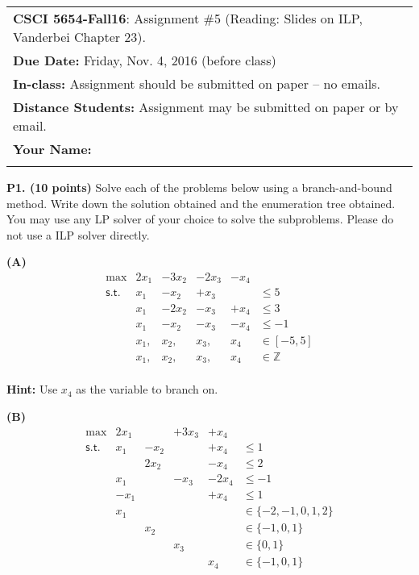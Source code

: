 \documentclass[11pt]{article}
\begin{document}
\begin{tabular}{l}
	\textbf{CSCI 5654-Fall16}: Assignment \#5 (Reading: Slides on ILP, Vanderbei Chapter 23).                                                  \\
	\textbf{Due Date:} Friday, Nov. 4, 2016 (before class)            \\
	\textbf{In-class:} Assignment should be submitted on paper -- no emails. \\
	\textbf{Distance Students:} Assignment may be submitted on paper or
	by email.                                                                \\[10pt]

	\textbf{Your Name:} \phantom{Supercalifragilisticexpialidocius Smith}    \\
	\hline
	                                                                         \\[10pt]
\end{tabular}

\noindent\textbf{P1. (10 points)} Solve each of the problems below using a branch-and-bound method. Write down the solution obtained and the enumeration tree
obtained. You may use any LP solver of your choice to solve the
subproblems. Please do not use a ILP solver directly.

\noindent\textbf{(A)} 
\[\begin{array}{rlllll}
\max & 2 x_1 & - 3 x_2 & -2 x_3 & - x_4 \\
\mathsf{s.t.} & x_1 & - x_2 & + x_3 &   & \leq 5 \\
& x_1 & - 2 x_2 & - x_3 & +x_4   & \leq 3 \\
& x_1 & - x_2 & - x_3 & - x_4 & \leq -1 \\
& x_1, & x_2, & x_3, & x_4 & \in [-5, 5] \\
& x_1, & x_2, & x_3, & x_4 & \in \mathbb{Z} \\
\end{array} \]

\noindent\textbf{Hint:} Use $x_4$ as the variable to branch on.

\noindent\textbf{(B)} 
\[ \begin{array}{rlllll}
\max & 2 x_1 &  & + 3 x_3 & + x_4 \\
\mathsf{s.t.}  & x_1 & - x_2 &  & + x_4 & \leq 1 \\
&  & 2 x_2 &  & - x_4 & \leq 2 \\
& x_1 &  & - x_3 & - 2 x_4 & \leq -1 \\
& -x_1 & &   & + x_4 & \leq 1\\
& x_1 &  &   &    & \in \{ -2,-1, 0, 1,2 \} \\
&   & x_2 &  &    & \in \{ -1, 0, 1 \} \\
&   &     & x_3 & & \in \{ 0, 1\} \\
&   &     &    & x_4 & \in \{ -1, 0, 1\} \\
\end{array}\]
\end{document}
